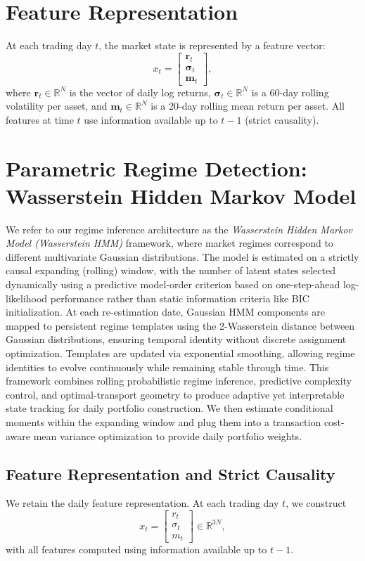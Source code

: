 \documentclass[11pt]{article}
\begin{document}
\section{Feature Representation}
\label{sec:features}

At each trading day $t$, the market state is represented by a feature vector:
\[
x_t =
\begin{bmatrix}
\mathbf{r}_t \\
\boldsymbol{\sigma}_t \\
\boldsymbol{m}_t
\end{bmatrix},
\]
where $\mathbf{r}_t \in \mathbb{R}^N$ is the vector of daily log returns,
$\boldsymbol{\sigma}_t \in \mathbb{R}^N$ is a 60-day rolling volatility per asset,
and $\boldsymbol{m}_t \in \mathbb{R}^N$ is a 20-day rolling mean return per asset.
All features at time $t$ use information available up to $t-1$ (strict causality).

\section{Parametric Regime Detection: Wasserstein Hidden Markov Model}
\label{sec:parametric_regime}

We refer to our regime inference architecture as the \emph{Wasserstein Hidden Markov Model (Wasserstein HMM)} framework, where market regimes correspond to different multivariate Gaussian distributions. The model is estimated on a strictly causal expanding (rolling) window, with the number of latent states selected dynamically using a predictive model-order criterion based on one-step-ahead log-likelihood performance rather than static information criteria like BIC initialization. At each re-estimation date, Gaussian HMM components are mapped to persistent regime templates using the 2-Wasserstein distance between Gaussian distributions, ensuring temporal identity without discrete assignment optimization. Templates are updated via exponential smoothing, allowing regime identities to evolve continuously while remaining stable through time. This framework combines rolling probabilistic regime inference, predictive complexity control, and optimal-transport geometry to produce adaptive yet interpretable state tracking for daily portfolio construction. We then estimate conditional moments within the expanding window and plug them into a transaction cost-aware mean variance optimization to provide daily portfolio weights.

\subsection{Feature Representation and Strict Causality}
We retain the daily feature representation. At each trading day $t$, we construct
\[
x_t = \begin{bmatrix} r_t \\ \sigma_t \\ m_t \end{bmatrix} \in \mathbb{R}^{3N},
\]
with all features computed using information available up to $t-1$.
\end{document}
